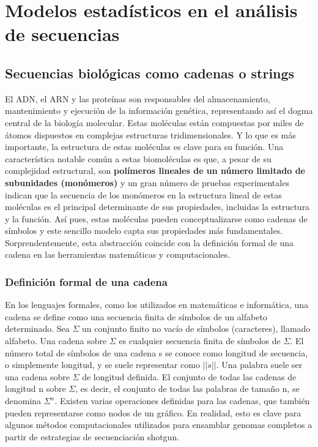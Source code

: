 \chapter{Modelos estadísticos en el análisis de secuencias}
\section{Secuencias biológicas como cadenas o strings}
El ADN, el ARN y las proteínas son responsables del almacenamiento, mantenimiento y ejecución de la información genética, representando así el dogma central de la biología molecular. Estas moléculas están compuestas por miles de átomos dispuestos en complejas estructuras tridimensionales. Y lo que es más importante, la estructura de estas moléculas es clave para su función. Una característica notable común a estas biomoléculas es que, a pesar de su complejidad estructural, son \textbf{polímeros lineales de un número limitado de subunidades (monómeros)} y un gran número de pruebas experimentales indican que la secuencia de los monómeros en la estructura lineal de estas moléculas es el principal determinante de sus propiedades, incluidas la estructura y la función. Así pues, estas moléculas pueden conceptualizarse como cadenas de símbolos y este sencillo modelo capta sus propiedades más fundamentales. Sorprendentemente, esta abstracción coincide con la definición formal de una cadena en las herramientas matemáticas y computacionales.

\subsection{Definición formal de una cadena}
En los lenguajes formales, como los utilizados en matemáticas e informática, una cadena se define como una secuencia finita de símbolos de un alfabeto determinado. Sea $\Sigma$ un conjunto finito no vacío de símbolos (caracteres), llamado alfabeto. Una cadena sobre $\Sigma$ es cualquier secuencia finita de símbolos de $\Sigma$. El número total de símbolos de una cadena s se conoce como longitud de secuencia, o simplemente longitud, y se suele representar como $||s||$. Una palabra suele ser una cadena sobre $\Sigma$ de longitud definida. El conjunto de todas las cadenas de longitud n sobre $\Sigma$, es decir, el conjunto de todas las palabras de tamaño n, se denomina $\Sigma^n$. Existen varias operaciones definidas para las cadenas, que también pueden representarse como nodos de un gráfico. En realidad, esto es clave para algunos métodos computacionales utilizados para ensamblar genomas completos a partir de estrategias de secuenciación shotgun.

